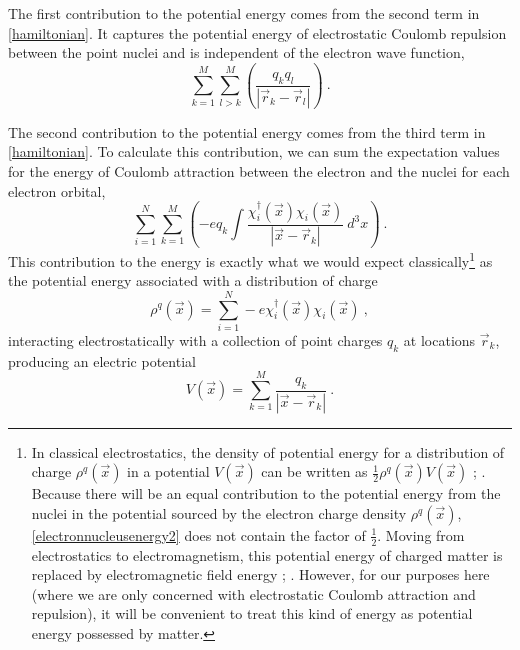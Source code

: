 \documentclass[12pt,onecolumn,secnumarabic,amsmath,amssymb,balancelastpage,nofootinbib]{article}
\begin{document}
The first contribution to the potential energy comes from the second term in \eqref{hamiltonian}.  It captures the potential energy of electrostatic Coulomb repulsion between the point nuclei and is independent of the electron wave function,
\begin{equation}
\sum_{k=1}^{M}\sum_{l>k}^{M} \left(\frac{q_k q_l}{|\vec{r}_k-\vec{r}_l|}\right)
\ .
\label{nucleusnucleusenergy}
\end{equation}

The second contribution to the potential energy comes from the third term in \eqref{hamiltonian}.  To calculate this contribution, we can sum the expectation values for the energy of Coulomb attraction between the electron and the nuclei for each electron orbital,
\begin{equation}
\sum_{i=1}^{N}\sum_{k=1}^{M}\left(-e q_k \int{ \frac{\chi_i^{\dagger}(\vec{x})\chi_i(\vec{x})}{|\vec{x}-\vec{r}_k|}\  d^3 x}\right)
\ .
\label{electronnucleusenergy}
\end{equation}
This contribution to the energy is exactly what we would expect classically\footnote{In classical electrostatics, the density of potential energy for a distribution of charge $\rho^q(\vec{x})$ in a potential $V(\vec{x})$ can be written as $\frac{1}{2}\rho^q(\vec{x}) V(\vec{x})$ \cite[sec.\ 1.11]{jackson}; \cite[sec.\ 2.4]{griffiths}.  Because there will be an equal contribution to the potential energy from the nuclei in the potential sourced by the electron charge density $\rho^q(\vec{x})$, \eqref{electronnucleusenergy2} does not contain the factor of $\frac{1}{2}$.  Moving from electrostatics to electromagnetism, this potential energy of charged matter is replaced by electromagnetic field energy \cite[ch.\ 5]{lange}; \cite[sec.\ 2.4.4]{griffiths}.  However, for our purposes here (where we are only concerned with electrostatic Coulomb attraction and repulsion), it will be convenient to treat this kind of energy as potential energy possessed by matter.} as the potential energy associated with a distribution of charge
\begin{equation}
\rho^q(\vec{x})=\sum_{i=1}^{N}-e\chi_i^{\dagger}(\vec{x})\chi_i(\vec{x})
\ ,
\label{chargedensity1}
\end{equation}
interacting electrostatically with a collection of point charges $q_k$ at locations $\vec{r}_k$, producing an electric potential
\begin{equation}
V(\vec{x})=\sum_{k=1}^{M}\frac{q_k}{|\vec{x}-\vec{r}_k|} 
\ .
\label{potentialfromnuclei}
\end{equation}
\end{document}
